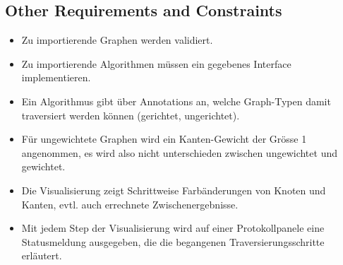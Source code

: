 \subsection{Other Requirements and Constraints}	
\label{subsec:Other Requirements and Constraints}
\begin{itemize}
  \item Zu importierende Graphen werden validiert.
  \item Zu importierende Algorithmen m\"ussen ein gegebenes Interface implementieren.
  \item Ein Algorithmus gibt \"uber Annotations an, welche Graph-Typen damit traversiert werden k\"onnen (gerichtet, ungerichtet).
  \item F\"ur ungewichtete Graphen wird ein Kanten-Gewicht der Gr\"osse 1 angenommen, es wird also nicht unterschieden zwischen ungewichtet und gewichtet.
  \item Die Visualisierung zeigt Schrittweise Farb\"anderungen von Knoten und Kanten, evtl. auch errechnete Zwischenergebnisse.
  \item Mit jedem Step der Visualisierung wird auf einer Protokollpanele eine Statusmeldung ausgegeben, die die begangenen Traversierungsschritte erl\"autert.
\end{itemize}